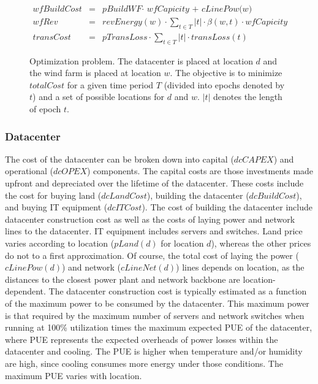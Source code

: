 \begin{figure}
\begin{scriptsize}
\begin{eqnarray}
  \textit{wfBuildCost}&=& \textit{pBuildWF} \cdot \textit{ wfCapicity + cLinePow(w)} \\
  \textit{wfRev}&=& \textit{revEnergy}(w) \cdot  \sum_{t \in T}{ |t| \cdot
                    \beta(w,t) \cdot  \textit{wfCapicity} } \\
  \textit{transCost}&=& \textit{pTransLoss} \cdot \sum_{t \in T}{ |t| \cdot  \textit{transLoss}(t)} %
\end{eqnarray}
\end{scriptsize}
\caption{Optimization problem.  The datacenter is placed at location
  $d$ and the wind farm is placed at location $w$.  The objective is to minimize $totalCost$ for a given time period $T$ (divided into epochs denoted by $t$) and a set of possible locations for $d$ and $w$.  $|t|$ denotes the length of epoch $t$.}
\label{fig:optimization}
\vspace{-0.2in}
\end{figure}




\subsubsection{Datacenter} The cost of the datacenter can be broken down into capital ($dcCAPEX$) and operational ($dcOPEX$) components.  The capital costs are those investments made upfront and depreciated over the lifetime of the datacenter.  These costs include the cost for buying land ($dcLandCost$), building the datacenter ($dcBuildCost$), and buying IT equipment ($dcITCost$).  The cost of building the datacenter include datacenter construction cost as well as the costs of laying power and network lines to the datacenter.  IT equipment includes servers and switches.  Land price varies according to location ($pLand(d)$ for location $d$), whereas the other prices do not to a first approximation.  Of course, the total cost of laying the power ($cLinePow(d)$) and network ($cLineNet(d)$) lines depends on location, as the distances to the closest power plant and network backbone are location-dependent.  The datacenter construction cost is typically estimated as a function of the maximum power to be consumed by the datacenter.  This maximum power is that required by the maximum number of servers and network switches when running at 100\% utilization times the maximum expected PUE of the datacenter, where PUE represents the expected overheads of power losses within the datacenter and cooling.
The PUE is higher when temperature and/or humidity are high, since cooling consumes more energy under those conditions.  The maximum PUE varies with location.

